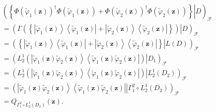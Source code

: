 \documentclass[aps,preprint]{revtex4}%
\begin{document}
\begin{align}
&  \left(  \left.  \left\{  \Phi\left(  \tilde{\varphi}_{1}\left(
\mathbf{z}\right)  \right)  ^{\dagger}\Phi\left(  \tilde{\varphi}_{1}\left(
\mathbf{z}\right)  \right)  +\Phi\left(  \tilde{\varphi}_{2}\left(
\mathbf{z}\right)  \right)  ^{\dagger}\Phi\left(  \tilde{\varphi}_{2}\left(
\mathbf{z}\right)  \right)  \right\}  \right\vert D\right)  _{\mathcal{F}%
}\nonumber\\
&  =\left(  \left.  \Gamma\left(  \left\{  \left\vert \tilde{\varphi}%
_{1}\left(  \mathbf{z}\right)  \right\rangle \left\langle \tilde{\varphi}%
_{1}\left(  \mathbf{z}\right)  \right\vert +\left\vert \tilde{\varphi}%
_{2}\left(  \mathbf{z}\right)  \right\rangle \left\langle \tilde{\varphi}%
_{2}\left(  \mathbf{z}\right)  \right\vert \right\}  \right)  \right\vert
D\right)  _{\mathcal{F}}\nonumber\\
&  =\left(  \left.  \left\{  \left\vert \tilde{\varphi}_{1}\left(
\mathbf{z}\right)  \right\rangle \left\langle \tilde{\varphi}_{1}\left(
\mathbf{z}\right)  \right\vert +\left\vert \tilde{\varphi}_{2}\left(
\mathbf{z}\right)  \right\rangle \left\langle \tilde{\varphi}_{2}\left(
\mathbf{z}\right)  \right\vert \right\}  \right\vert L\left(  D\right)
\right)  _{\mathcal{F}}\nonumber\\
&  =\left(  \left.  L_{2}^{1}\left(  \left\vert \tilde{\varphi}_{1}\left(
\mathbf{z}\right)  \tilde{\varphi}_{2}\left(  \mathbf{z}\right)  \right\rangle
\left\langle \tilde{\varphi}_{1}\left(  \mathbf{z}\right)  \tilde{\varphi}%
_{2}\left(  \mathbf{z}\right)  \right\vert \right)  \right\vert D_{1}\right)
_{\mathcal{F}}\nonumber\\
&  =\left(  \left.  L_{2}^{1}\left(  \left\vert \tilde{\varphi}_{1}\left(
\mathbf{z}\right)  \tilde{\varphi}_{2}\left(  \mathbf{z}\right)  \right\rangle
\left\langle \tilde{\varphi}_{1}\left(  \mathbf{z}\right)  \tilde{\varphi}%
_{2}\left(  \mathbf{z}\right)  \right\vert \right)  \right\vert L_{2}%
^{1}\left(  D_{2}\right)  \right)  _{\mathcal{F}}\nonumber\\
&  =\left(  \left.  \left\vert \tilde{\varphi}_{1}\left(  \mathbf{z}\right)
\tilde{\varphi}_{2}\left(  \mathbf{z}\right)  \right\rangle \left\langle
\tilde{\varphi}_{1}\left(  \mathbf{z}\right)  \tilde{\varphi}_{2}\left(
\mathbf{z}\right)  \right\vert \right\vert \Gamma_{1}^{2}\circ L_{2}%
^{1}\left(  D_{2}\right)  \right)  _{\mathcal{F}}\nonumber\\
&  =Q_{\Gamma_{1}^{2}\circ L_{2}^{1}\left(  D_{2}\right)  }\left(
\mathbf{z}\right)  .
\end{align}
\end{document}
